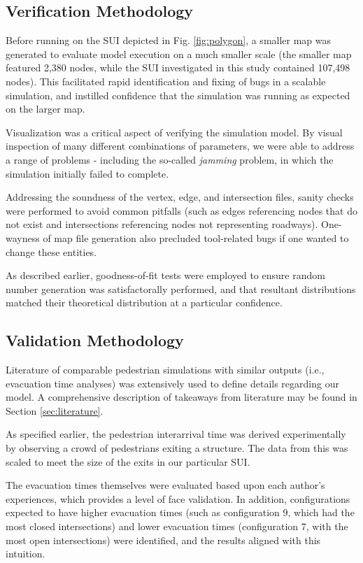 \documentclass[12pt]{article}
\begin{document}
\subsection{Verification Methodology}
Before running on the SUI depicted in Fig. \ref{fig:polygon}, a smaller map
was generated to evaluate model execution on a much smaller scale (the smaller
map featured 2,380 nodes, while the SUI investigated in this study contained
107,498 nodes). This facilitated rapid identification and fixing of bugs in
a scalable simulation, and instilled confidence that the simulation was running
as expected on the larger map.

Visualization was a critical aspect of verifying the simulation model. By
visual inspection of many different combinations of parameters, we were able to
address a range of problems - including the so-called \textit{jamming} problem,
in which the simulation initially failed to complete.

Addressing the soundness of the vertex, edge, and intersection files, sanity
checks were performed to avoid common pitfalls (such as edges referencing
nodes that do not exist and intersections referencing nodes not representing
roadways). One-wayness of map file generation also precluded tool-related
bugs if one wanted to change these entities.

As described earlier, goodness-of-fit tests were employed to ensure random
number generation was satisfactorally performed, and that resultant distributions
matched their theoretical distribution at a particular confidence.

\subsection{Validation Methodology}
Literature of comparable pedestrian simulations with similar outputs (i.e.,
evacuation time analyses) was extensively used to define details regarding
our model. A comprehensive description of takeaways from literature may be
found in Section \ref{sec:literature}.

As specified earlier, the pedestrian interarrival time was derived
experimentally by observing a crowd of pedestrians exiting a structure. The
data from this was scaled to meet the size of the exits in our particular SUI.

The evacuation times themselves were evaluated based upon each author's
experiences, which provides a level of face validation. In addition,
configurations expected to have higher evacuation times (such as configuration
9, which had the most closed intersections) and lower evacuation times
(configuration 7, with the most open intersections) were identified, and the
results aligned with this intuition.
\end{document}
